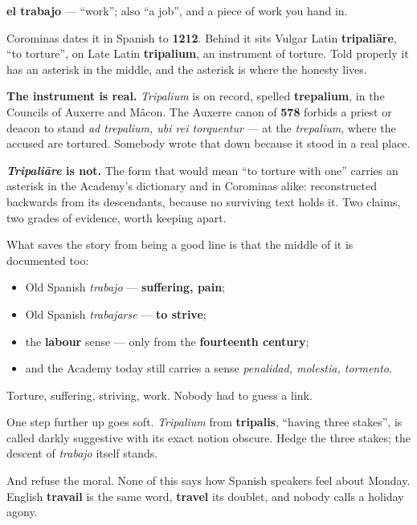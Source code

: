 \begin{cousinweb}
\textbf{el trabajo} — \textquotedblleft{}work\textquotedblright{}; also \textquotedblleft{}a job\textquotedblright{}, and a piece of work you hand in.

Corominas dates it in Spanish to \textbf{1212}. Behind it sits Vulgar Latin \textbf{tripaliāre}, \textquotedblleft{}to torture\textquotedblright{}, on Late Latin \textbf{tripalium}, an instrument of torture. Told properly it has an asterisk in the middle, and the asterisk is where the honesty lives.

\textbf{The instrument is real.} \emph{Tripalium} is on record, spelled \textbf{trepalium}, in the Councils of Auxerre and Mâcon. The Auxerre canon of \textbf{578} forbids a priest or deacon to stand \emph{ad trepalium, ubi rei torquentur} — at the \emph{trepalium}, where the accused are tortured. Somebody wrote that down because it stood in a real place.

\textbf{\emph{Tripaliāre} is not.} The form that would mean \textquotedblleft{}to torture with one\textquotedblright{} carries an asterisk in the Academy's dictionary and in Corominas alike: reconstructed backwards from its descendants, because no surviving text holds it. Two claims, two grades of evidence, worth keeping apart.

What saves the story from being a good line is that the middle of it is documented too:

\begin{itemize}
\raggedright
  \item Old Spanish \emph{trabajo} — \textbf{suffering, pain};
  \item Old Spanish \emph{trabajarse} — \textbf{to strive};
  \item the \textbf{labour} sense — only from the \textbf{fourteenth century};
  \item and the Academy today still carries a sense \emph{penalidad, molestia, tormento}.
\end{itemize}

Torture, suffering, striving, work. Nobody had to guess a link.

One step further up goes soft. \emph{Tripalium} from \textbf{tripalis}, \textquotedblleft{}having three stakes\textquotedblright{}, is called darkly suggestive with its exact notion obscure. Hedge the three stakes; the descent of \emph{trabajo} itself stands.

And refuse the moral. None of this says how Spanish speakers feel about Monday. English \textbf{travail} is the same word, \textbf{travel} its doublet, and nobody calls a holiday agony.
\end{cousinweb}

